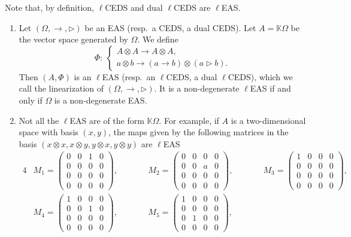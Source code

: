 \documentclass[10pt,a4paper]{amsart}
\numberwithin{equation}{section}
\begin{document}
Note that, by definition, $\ell$CEDS and dual $\ell$CEDS are $\ell$EAS.

\begin{Example}\label{ex4.1} \quad
\begin{enumerate}\itemsep=0pt
\item[(1)] Let $(\Omega,\rightarrow,\triangleright)$ be an EAS (resp.\ a CEDS, a dual CEDS). Let $A=\mathbb{K} \Omega$ be the vector space generated by $\Omega$. We define
\[\Phi\colon \ \begin{cases}
A\otimes A \longrightarrow A\otimes A,\\
a\otimes b \longrightarrow (a\rightarrow b)\otimes (a\triangleright b).
\end{cases}\]
Then $(A,\Phi)$ is an $\ell$EAS (resp.\ an $\ell$CEDS, a dual $\ell$CEDS), which we call the linearization of $(\Omega,\rightarrow,\triangleright)$. It is a non-degenerate $\ell$EAS if and only if $\Omega$ is a non-degenerate EAS.
\item[(2)] Not all the $\ell$EAS are of the form $\mathbb{K}\Omega$. For example, if $A$ is a two-dimensional space with basis $(x,y)$, the maps given by the following matrices in the basis $(x\otimes x,x\otimes y,y\otimes x,y\otimes y)$ are $\ell$EAS
\begin{alignat*}{4}
&M_1 =\begin{pmatrix}0&0&1&0\\0&0&0&0\\0&0&0&0\\0&0&0&0\end{pmatrix},\qquad&&
M_2 =\begin{pmatrix}0&0&0&0\\0&0&a&0\\0&0&0&0\\0&0&0&0\end{pmatrix},\qquad&&
M_3=\begin{pmatrix}1&0&0&0\\0&0&0&0\\0&0&0&0\\0&0&0&0\end{pmatrix},&\\
&M_4=\begin{pmatrix}1&0&0&0\\0&0&1&0\\0&0&0&0\\0&0&0&0\end{pmatrix},\qquad&&
M_5=\begin{pmatrix}1&0&0&0\\0&0&0&0\\0&1&0&0\\0&0&0&0\end{pmatrix},\qquad&&

\end{alignat*}
\end{enumerate}
\end{Example}
\end{document}
